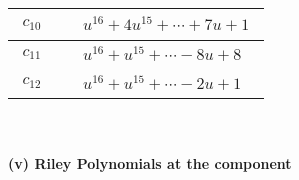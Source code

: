 \documentclass[1p]{elsarticle_modified}
\theoremstyle{definition}
\begin{document}
\begin{tabular}{m{50pt}|m{274pt}}
\hline $$\begin{aligned}c_{10}\end{aligned}$$&$\begin{aligned}
&u^{16}+4 u^{15}+\cdots+7 u+1
\end{aligned}$\\
\hline $$\begin{aligned}c_{11}\end{aligned}$$&$\begin{aligned}
&u^{16}+u^{15}+\cdots-8 u+8
\end{aligned}$\\
\hline $$\begin{aligned}c_{12}\end{aligned}$$&$\begin{aligned}
&u^{16}+u^{15}+\cdots-2 u+1
\end{aligned}$\\
\hline
\end{tabular}\\~\\
\newpage\renewcommand{\arraystretch}{1}
\flushleft \textbf{(v) Riley Polynomials at the component}\newline \\
\end{document}
